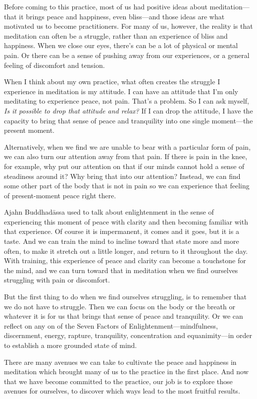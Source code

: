 
Before coming to this practice, most of us had positive ideas about 
meditation---that it brings peace and happiness, even bliss---and those 
ideas are what motivated us to become practitioners. For many of us, 
however, the reality is that meditation can often be a struggle, rather 
than an experience of bliss and happiness. When we close our eyes, 
there's can be a lot of physical or mental pain. Or there can be a 
sense of pushing away from our experiences, or a general feeling of 
discomfort and tension.

When I think about my own practice, what often creates the struggle I 
experience in meditation is my attitude. I can have an attitude that 
I'm only meditating to experience peace, not pain. That's a problem. So 
I can ask myself, \emph{Is it possible to drop that attitude and 
relax?} If I can drop the attitude, I have the capacity to bring that 
sense of peace and tranquility into one single moment---the present 
moment.

Alternatively, when we find we are unable to bear with a particular 
form of pain, we can also turn our attention away from that pain. If 
there is pain in the knee, for example, why put our attention on that 
if our minds cannot hold a sense of steadiness around it? Why bring 
that into our attention? Instead, we can find some other part of the 
body that is not in pain so we can experience that feeling of 
present-moment peace right there.

Ajahn Buddhadāssa used to talk about enlightenment in the sense of 
experiencing this moment of peace with clarity and then becoming 
familiar with that experience. Of course it is impermanent, it comes 
and it goes, but it is a taste. And we can train the mind to incline 
toward that state more and more often, to make it stretch out a little 
longer, and return to it throughout the day. With training, this 
experience of peace and clarity can become a touchstone for the mind, 
and we can turn toward that in meditation when we find ourselves 
struggling with pain or discomfort.

But the first thing to do when we find ourselves struggling, is to 
remember that we do not have to struggle. Then we can focus on the body 
or the breath or whatever it is for us that brings that sense of peace 
and tranquility. Or we can reflect on any on of the Seven Factors of 
Enlightenment---mindfulness, discernment, energy, rapture, tranquility, 
concentration and equanimity---in order to establish a more grounded 
state of mind.

There are many avenues we can take to cultivate the peace and happiness 
in meditation which brought many of us to the practice in the first 
place. And now that we have become committed to the practice, our job 
is to explore those avenues for ourselves, to discover which ways lead 
to the most fruitful results.

